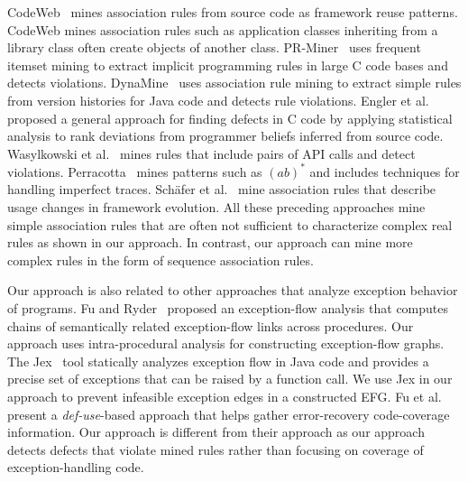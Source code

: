 CodeWeb~\cite{Michail:mining} mines association rules
from source code as framework reuse patterns. 
CodeWeb mines association rules such as application classes inheriting
from a library class often create objects of another class.
PR-Miner~\cite{Zhenmin2005PRMiner} uses frequent itemset
mining to extract implicit programming rules in large C code bases and detects
violations. DynaMine~\cite{livshits05dynamine} 
uses association rule mining to extract simple rules from version
histories for Java code and detects rule violations. Engler et al.~\cite{Engler2001deviant} 
proposed a general approach for finding defects in C code by applying statistical
analysis to rank deviations from programmer beliefs inferred from source code.
Wasylkowski et al.~\cite{wasylkowski07:detecting} mines rules that include
pairs of API calls and detect violations. 
Perracotta~\cite{Yang06perracotta:mining} mines patterns such as $(ab)^*$ and 
includes techniques for handling imperfect traces.
Sch\"{a}fer et al.~\cite{thorsten:mining} mine 
association rules that describe usage changes in framework evolution.
All these preceding approaches mine simple association rules that are often not
sufficient to characterize complex real rules as shown in our approach. 
In contrast, our approach can mine more complex
rules in the form of sequence association rules.

Our approach is also related to other approaches that analyze exception behavior
of programs. Fu and Ryder~\cite{Fu:exception-chain} proposed an exception-flow analysis
that computes chains of semantically related exception-flow links across procedures.
Our approach uses intra-procedural analysis for constructing exception-flow graphs. 
The Jex~\cite{Jex:Robillard} tool statically analyzes exception flow
in Java code and provides a precise set of exceptions that can be raised by a
function call. We use Jex in our approach to prevent infeasible exception edges
in a constructed EFG. Fu et al.~\cite{Fu:web-service-testing} present a 
\emph{def-use}-based approach that helps gather error-recovery code-coverage information. 
Our approach is different from their approach as our approach detects defects that violate mined
rules rather than focusing on coverage of exception-handling code. 

